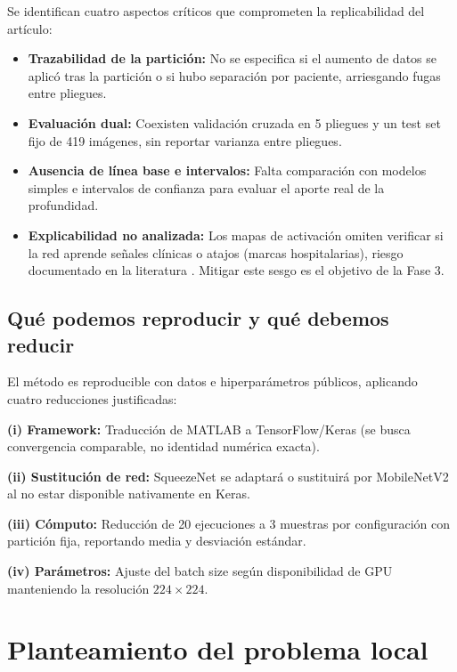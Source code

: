 \documentclass[11pt]{article}
\begin{document}
Se identifican cuatro aspectos críticos que comprometen la replicabilidad del artículo:
\begin{itemize}
  \item \textbf{Trazabilidad de la partición:} No se especifica si el aumento de datos se aplicó tras la partición o si hubo separación por paciente, arriesgando fugas entre pliegues.
  \item \textbf{Evaluación dual:} Coexisten validación cruzada en 5 pliegues y un test set fijo de 419 imágenes, sin reportar varianza entre pliegues.
  \item \textbf{Ausencia de línea base e intervalos:} Falta comparación con modelos simples e intervalos de confianza para evaluar el aporte real de la profundidad.
  \item \textbf{Explicabilidad no analizada:} Los mapas de activación omiten verificar si la red aprende señales clínicas o atajos (marcas hospitalarias), riesgo documentado en la literatura \parencite{zech2018, degrave2021}. Mitigar este sesgo es el objetivo de la Fase 3.
\end{itemize}

\subsection{Qué podemos reproducir y qué debemos reducir}

El método es reproducible con datos e hiperparámetros públicos, aplicando cuatro reducciones justificadas:

\textbf{(i) Framework:} Traducción de MATLAB a TensorFlow/Keras (se busca convergencia comparable, no identidad numérica exacta).

\textbf{(ii) Sustitución de red:} SqueezeNet se adaptará o sustituirá por MobileNetV2 al no estar disponible nativamente en Keras.

\textbf{(iii) Cómputo:} Reducción de 20 ejecuciones a 3 muestras por configuración con partición fija, reportando media y desviación estándar.

\textbf{(iv) Parámetros:} Ajuste del batch size según disponibilidad de GPU manteniendo la resolución $224\times224$.

\section{Planteamiento del problema local}
\end{document}
